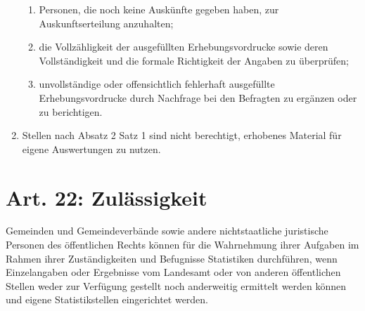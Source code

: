 \documentclass[A4, 12pt]{scrbook}
\begin{document}
\begin{enumerate}[label=(\arabic*)]
\begin{enumerate}[label=\arabic*.]
                    \item Personen, die noch keine Auskünfte gegeben haben, zur Auskunftserteilung anzuhalten;
                    \item die Vollzähligkeit der ausgefüllten Erhebungsvordrucke sowie deren Voll\-stän\-dig\-keit und die formale Richtigkeit der Angaben zu überprüfen;
                    \item unvollständige oder offensichtlich fehlerhaft ausgefüllte Erhebungsvordrucke durch Nachfrage bei den Befragten zu ergänzen oder zu berichtigen.
                \end{enumerate}
            \item Stellen nach Absatz 2 Satz 1 sind nicht berechtigt, erhobenes Material für eigene Auswertungen zu nutzen.
        \end{enumerate}

    \section{Art. 22: Zulässigkeit}
        Gemeinden und Gemeindeverbände sowie andere nichtstaatliche juristische Personen des öffentlichen Rechts können für die Wahrnehmung ihrer Aufgaben im Rahmen ihrer Zuständigkeiten und Befugnisse Statistiken durchführen, wenn Einzelangaben oder Ergebnisse vom Landesamt oder von anderen öffentlichen Stellen weder zur Verfügung gestellt noch anderweitig ermittelt werden können und eigene Statistikstellen eingerichtet werden.
\end{document}
